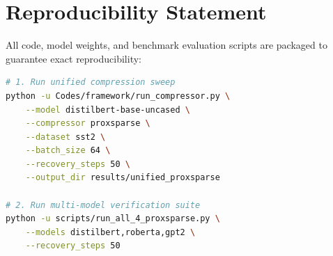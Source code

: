 \section{Reproducibility Statement}
All code, model weights, and benchmark evaluation scripts are packaged to guarantee exact reproducibility:
\begin{lstlisting}[language=bash]
# 1. Run unified compression sweep
python -u Codes/framework/run_compressor.py \
    --model distilbert-base-uncased \
    --compressor proxsparse \
    --dataset sst2 \
    --batch_size 64 \
    --recovery_steps 50 \
    --output_dir results/unified_proxsparse

# 2. Run multi-model verification suite
python -u scripts/run_all_4_proxsparse.py \
    --models distilbert,roberta,gpt2 \
    --recovery_steps 50
\end{lstlisting}
